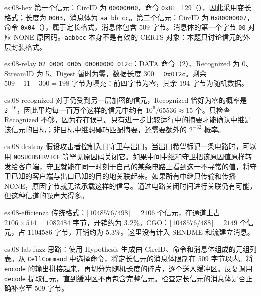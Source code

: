 \begin{soluzione}{es:08-hex}
第一个信元：CircID 为 \texttt{00000000}，命令 \texttt{0x81}=129（），因此采用变长格式；长度为 \texttt{0003}，消息体为 \texttt{aa bb cc}。第二个信元：CircID 为 \texttt{0x80000007}，命令 \texttt{0x04}（），属于定长格式，消息体包含 509 字节。消息体的第一个字节 \texttt{00} 对应 NONE 原因码。\texttt{aabbcc} 本身不是有效的 CERTS 对象：本题只讨论信元的外层封装格式。
\end{soluzione}

\begin{soluzione}{es:08-relay}
\texttt{02 0000 0005 00000000 012c}：DATA 命令（2）、Recognized 为 0、StreamID 为 5、Digest 暂时为零，数据长度 $300=\texttt{0x012c}$。剩余 $509-11-300=198$ 字节为填充：前四字节为零，其余 194 字节为随机数据。
\end{soluzione}

\begin{soluzione}{es:08-recognized}
对于仍受到另一层加密的信元，Recognized 恰好为零的概率是 $2^{-16}$，因此平均每一百万个这样的信元中约有 $10^6/65536\approx15$ 个。只检查 Recognized 不够，因为存在误判。只有进一步比较运行中的摘要才能确认中继是该信元的目标；非目标中继想碰巧匹配摘要，还需要额外的 $2^{-32}$ 概率。
\end{soluzione}

\begin{soluzione}{es:08-destroy}
假设攻击者控制入口守卫与出口。当出口希望标记一条电路时，可以用 \texttt{NOSUCHSERVICE} 等罕见原因码关闭它。如果中间中继和守卫把该原因值原样转发给客户端，守卫就能在同一时刻于自己的某条电路上看到这一不寻常的值，将守卫已知的客户端与出口已知的目的地关联起来。如果所有中继只传输和传播 NONE，原因字节就无法承载这样的信号。通过电路关闭时间进行关联仍有可能，但这种信道的噪声大得多。
\end{soluzione}

\begin{soluzione}{es:08-efficienza}
传统格式：$\lceil1048576/498\rceil=2106$ 个信元，在通道上占 $2106\times514=\num{1082484}$ 字节，开销约为 3.2\%。CGO：$\lceil1048576/488\rceil=2149$ 个信元，占 \num{1104586} 字节，开销约为 5.3\%。这里没有计入 SENDME 和流建立消息。
\end{soluzione}

\begin{soluzione}{es:08-lab-fuzz}
思路：使用 Hypothesis 生成由 CircID、命令和消息体组成的元组列表。从 \texttt{CellCommand} 中选择命令，将定长信元的消息体限制在 509 字节以内。将 \texttt{encode} 的输出拼接起来，再切分为随机长度的碎片，逐个送入缓冲区。反复调用 \texttt{decode} 提取信元，直到缓冲区不再包含完整信元。检查定长信元的消息体是否正确补零至 509 字节。
\end{soluzione}

